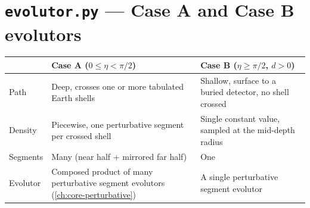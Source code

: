 \section{\texttt{evolutor.py} --- Case A and Case B evolutors}
\label{sec:earth-evolutor}


\begin{notebox}[title={Case A versus Case B}]
\begin{center}
\small
\begin{tabular}{@{}lll@{}}
\toprule
 & \textbf{Case A} ($0\le\eta<\pi/2$) & \textbf{Case B} ($\eta\ge\pi/2$, $d>0$) \\
\midrule
Path & \parbox[t]{4.6cm}{Deep, crosses one or more tabulated Earth shells} & \parbox[t]{4.6cm}{Shallow, surface to a buried detector, no shell crossed} \\[16pt]
Density & \parbox[t]{4.6cm}{Piecewise, one perturbative segment per crossed shell} & \parbox[t]{4.6cm}{Single constant value, sampled at the mid-depth radius} \\[16pt]
Segments & \parbox[t]{4.6cm}{Many (near half + mirrored far half)} & \parbox[t]{4.6cm}{One} \\[10pt]
Evolutor & \parbox[t]{4.6cm}{Composed product of many perturbative segment evolutors (\cref{ch:core-perturbative})} & \parbox[t]{4.6cm}{A single perturbative segment evolutor} \\[16pt]
\bottomrule
\end{tabular}
\end{center}
\end{notebox}

